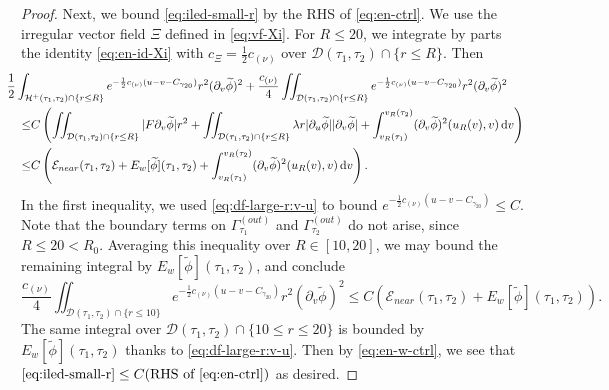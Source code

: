\documentclass[10pt, reqno]{amsart}
\theoremstyle{definition}
\theoremstyle{remark}
\theoremstyle{conjecture}
\numberwithin{equation}{section}
\newcommand{\abs}[1]{\vert#1\vert}
\newcommand{\set}[1]{\{#1\}}
\newcommand{\ud}{\mathrm{d}}
\newcommand{\rd}{\partial}
\newcommand{\0}{\emptyset}
\newcommand{\gmm}{\gamma}
\newcommand{\Gmm}{\Gamma}
\newcommand{\lmb}{\lambda}
\newcommand{\calD}{\mathcal D}
\newcommand{\calE}{\mathcal E}
\newcommand{\calH}{\mathcal H}
\newcommand{\dur}{\nu}
\newcommand{\dvr}{\lmb}
\newcommand{\EH}{\calH^{+}}
\newcommand{\phibg}{\overline{\phi}}				%
\newcommand{\phidf}{\widetilde{\phi}}				%
\begin{document}
\begin{proof}
Next, we bound \eqref{eq:iled-small-r} by the RHS of \eqref{eq:en-ctrl}. We use the irregular vector field $\Xi$ defined in \eqref{eq:vf-Xi}. 
For $R \leq 20$, we integrate by parts the identity \eqref{eq:en-id-Xi} with $c_{\Xi} = \frac{1}{2} c_{(\dur)}$ over $\calD(\tau_{1}, \tau_{2}) \cap \set{r \leq R}$. Then
\begin{align*}
& \hskip-2em
	\frac{1}{2} \int_{\EH(\tau_{1}, \tau_{2}) \cap \set{r \leq R}} e^{-\frac{1}{2} c_{(\dur)} (u - v - C_{\gmm_{20}})} r^{2} (\rd_{v} \phidf)^{2}
	+ \frac{c_{(\dur)}}{4} \iint_{\calD(\tau_{1}, \tau_{2}) \cap \set{r \leq R}} e^{-\frac{1}{2} c_{(\dur)} (u - v - C_{\gmm_{20}})} r^{2} (\rd_{v} \phidf)^{2} \\
	\leq & C \left( \iint_{\calD(\tau_{1}, \tau_{2}) \cap \set{r \leq R}} \abs{F \rd_{v} \phidf} r^{2} 
				+ \iint_{\calD(\tau_{1}, \tau_{2}) \cap \set{r \leq R}} \dvr r \abs{\rd_{u} \phidf} \abs{\rd_{v} \phidf} 
				+ \int_{v_{R}(\tau_{1})}^{v_{R}(\tau_{2})} (\rd_{v} \phidf)^{2}(u_{R}(v), v) \, \ud v \right) \\
	\leq & C \left( \calE_{near}(\tau_{1}, \tau_{2})
				+ E_{w}[\phidf](\tau_{1}, \tau_{2})
				+ \int_{v_{R}(\tau_{1})}^{v_{R}(\tau_{2})} (\rd_{v} \phidf)^{2}(u_{R}(v), v) \, \ud v \right).
\end{align*}
In the first inequality, we used \eqref{eq:df-large-r:v-u} to bound $e^{-\frac{1}{2} c_{(\dur)} (u - v - C_{\gmm_{20}})} \leq C$.
Note that the boundary terms on $\Gmm^{(out)}_{\tau_{1}}$ and $\Gmm^{(out)}_{\tau_{2}}$ do not arise, since $R \leq 20 < R_{0}$.
Averaging this inequality over $R \in [10, 20]$, we may bound the remaining integral by $E_{w}[\phidf](\tau_{1}, \tau_{2})$, and conclude
\begin{equation*}
	\frac{c_{(\dur)}}{4} \iint_{\calD(\tau_{1}, \tau_{2}) \cap \set{r \leq 10}} e^{-\frac{1}{2} c_{(\dur)} (u - v - C_{\gmm_{20}})} r^{2} (\rd_{v} \phidf)^{2} 
	\leq C \left( \calE_{near}(\tau_{1}, \tau_{2}) + E_{w}[\phidf](\tau_{1}, \tau_{2}) \right).
\end{equation*}
The same integral over $\calD(\tau_{1}, \tau_{2}) \cap \set{10 \leq r \leq 20}$ is bounded by $E_{w}[\phidf](\tau_{1},\tau_{2})$ thanks to \eqref{eq:df-large-r:v-u}. Then by \eqref{eq:en-w-ctrl}, we see that $\eqref{eq:iled-small-r} \leq C (\hbox{RHS of \eqref{eq:en-ctrl}})$ as desired.


\end{proof}
\end{document}
